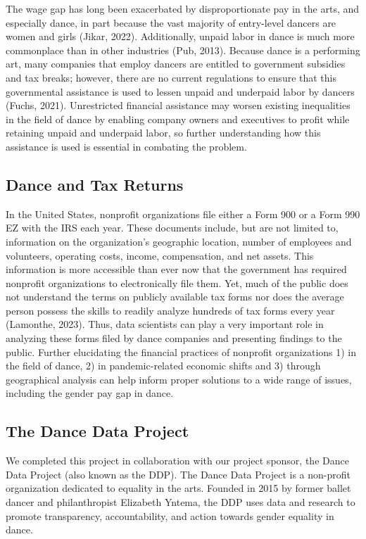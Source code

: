 \documentclass[Dance Data
Project,article,submit,moreauthors,pdftex]{mdpi}
\begin{document}
The wage gap has long been exacerbated by disproportionate pay in the
arts, and especially dance, in part because the vast majority of
entry-level dancers are women and girls (Jikar, 2022). Additionally,
unpaid labor in dance is much more commonplace than in other industries
(Pub, 2013). Because dance is a performing art, many companies that
employ dancers are entitled to government subsidies and tax breaks;
however, there are no current regulations to ensure that this
governmental assistance is used to lessen unpaid and underpaid labor by
dancers (Fuchs, 2021). Unrestricted financial assistance may worsen
existing inequalities in the field of dance by enabling company owners
and executives to profit while retaining unpaid and underpaid labor, so
further understanding how this assistance is used is essential in
combating the problem.

\hypertarget{dance-and-tax-returns}{%
\subsection{Dance and Tax Returns}\label{dance-and-tax-returns}}

In the United States, nonprofit organizations file either a Form 900 or
a Form 990 EZ with the IRS each year. These documents include, but are
not limited to, information on the organization's geographic location,
number of employees and volunteers, operating costs, income,
compensation, and net assets. This information is more accessible than
ever now that the government has required nonprofit organizations to
electronically file them. Yet, much of the public does not understand
the terms on publicly available tax forms nor does the average person
possess the skills to readily analyze hundreds of tax forms every year
(Lamonthe, 2023). Thus, data scientists can play a very important role
in analyzing these forms filed by dance companies and presenting
findings to the public. Further elucidating the financial practices of
nonprofit organizations 1) in the field of dance, 2) in pandemic-related
economic shifts and 3) through geographical analysis can help inform
proper solutions to a wide range of issues, including the gender pay gap
in dance.

\hypertarget{the-dance-data-project}{%
\subsection{The Dance Data Project}\label{the-dance-data-project}}

We completed this project in collaboration with our project sponsor, the
Dance Data Project (also known as the DDP). The Dance Data Project is a
non-profit organization dedicated to equality in the arts. Founded in
2015 by former ballet dancer and philanthropist Elizabeth Yntema, the
DDP uses data and research to promote transparency, accountability, and
action towards gender equality in dance.
\end{document}
